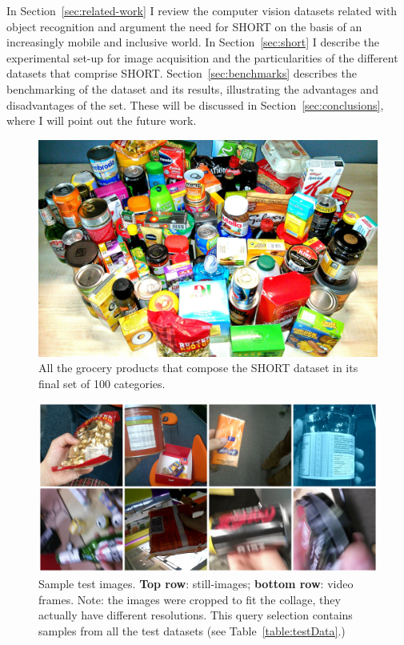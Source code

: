 In Section~\ref{sec:related-work} I review the computer vision datasets related with object recognition and argument the need for SHORT on the basis of an increasingly mobile and inclusive world. In Section~\ref{sec:short} I describe the experimental set-up for image acquisition and the particularities of the different datasets that comprise SHORT. Section~\ref{sec:benchmarks} describes the benchmarking of the dataset and its results, illustrating the advantages and disadvantages of the set. These will be discussed in Section~\ref{sec:conclusions}, where I will point out the future work.

\begin{figure}[h!]
\centering
\includegraphics[width=\textwidth]{./gfx/Chapter03/SHORT_family_photo.jpg}
\caption{All the grocery products that compose the SHORT dataset in its final set of 100 categories.}
\label{fig:short-100-all}
\end{figure}


\begin{figure}
\centering
\includegraphics[width=.75\linewidth]{./gfx/Chapter03/icip-test-imgs2.jpg}
\caption{Sample test images. \textbf{Top row}: still-images; \textbf{bottom row}: video frames. Note: the images were cropped to fit the collage, they actually have different resolutions. This query selection contains samples from all the test datasets (see Table~\ref{table:testData}.)}
\label{fig:short-30test}
\end{figure}

